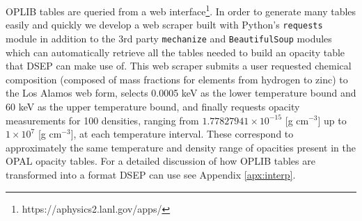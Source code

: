 OPLIB tables are queried from a web
interface\footnote{https://aphysics2.lanl.gov/apps/}. In order to generate many
tables easily and quickly we develop a web scraper built with Python's
\texttt{requests} module in addition to the 3rd party \texttt{mechanize} and
\texttt{BeautifulSoup} modules \citep{chandra2015python,
richardson2007beautiful} which can automatically retrieve all the tables needed
to build an opacity table that DSEP can make use of. This web scraper submits a user
requested chemical composition (composed of mass fractions for elements from
hydrogen to zinc) to the Los Alamos web form, selects 0.0005 keV as the lower
temperature bound and 60 keV as the upper temperature bound, and finally
requests opacity measurements for 100 densities, ranging from $1.77827941\times
10 ^{-15}$ [g cm$^{-3}$] up to $1\times10^{7}$ [g cm$^{-3}$], at each
temperature interval. These correspond to approximately the same temperature
and density range of opacities present in the OPAL opacity tables. For a
detailed discussion of how OPLIB tables are transformed into a format DSEP can
use see Appendix \ref{apx:interp}.


